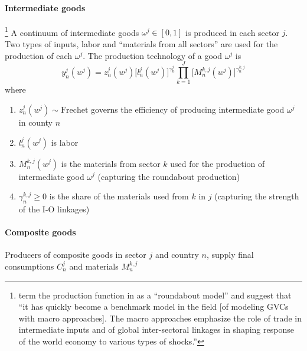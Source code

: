 \paragraph{Intermediate goods}%
\footnote{
    \cite{Antras:2022} term the production function in \cite{Caliendo:2015} as a ``roundabout model''
    and suggest that ``it has quickly become a benchmark model in the field [of modeling GVCs with macro approaches].
    The macro approaches emphasize the role of trade in intermediate inputs and of global inter-sectoral linkages 
    in shaping response of the world economy to various types of shocks.''
}
A continuum of intermediate goods $\omega^j \in [0, 1]$ is produced in each sector $j$.
Two types of inputs, labor and ``materials from all sectors'' are used for the 
production of each $\omega^j$.
The production technology of a good $\omega^j$ is 
\begin{equation}
    y_n^j(w^j) = z_n^j(w^j)\bigg[ l_n^j(w^j) \bigg]^{\gamma_n^j} \prod_{k=1}^J \bigg[ M_n^{k,j}(w^j) \bigg]^{\gamma_n^{k,j}}
\end{equation}
where
\begin{enumerate}
    \item $z_n^j(w^j) \sim \text{Frechet}$ governs the efficiency of producing intermediate good $\omega^j$ in county $n$
    \item $l_n^j(w^j)$ is labor
    \item $M_n^{k,j}(w^j)$ is the materials from sector $k$ used for the production of intermediate good $\omega^j$ (capturing the roundabout production)
    \item $\gamma_n^{k,j} \geq 0$ is the share of the materials used from $k$ in $j$ (capturing the strength of the I-O linkages)
\end{enumerate}

\paragraph{Composite goods}%
Producers of composite goods in sector $j$ and country $n$, supply final consumptions $C_n^j$ and materials $M_n^{k,j}$